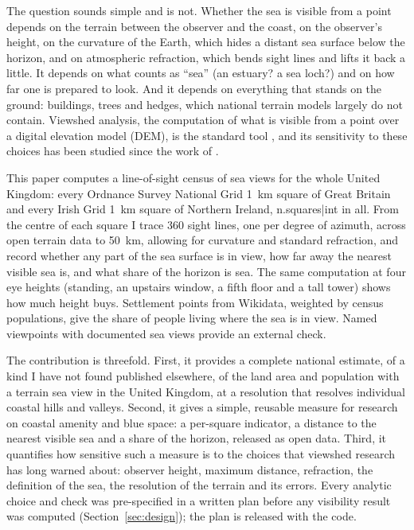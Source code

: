 The question sounds simple and is not. Whether the sea is visible from a point depends on the terrain between the observer and the coast, on the observer's height, on the curvature of the Earth, which hides a distant sea surface below the horizon, and on atmospheric refraction, which bends sight lines and lifts it back a little. It depends on what counts as ``sea'' (an estuary? a sea loch?) and on how far one is prepared to look. And it depends on everything that stands on the ground: buildings, trees and hedges, which national terrain models largely do not contain. Viewshed analysis, the computation of what is visible from a point over a digital elevation model (DEM), is the standard tool \citep{defloriani2003}, and its sensitivity to these choices has been studied since the work of \citet{fisher1991,fisher1992,fisher1993}.

This paper computes a line-of-sight census of sea views for the whole United Kingdom: every Ordnance Survey National Grid 1~km square of Great Britain and every Irish Grid 1~km square of Northern Ireland, {{n.squares|int}} in all. From the centre of each square I trace 360 sight lines, one per degree of azimuth, across open terrain data to 50~km, allowing for curvature and standard refraction, and record whether any part of the sea surface is in view, how far away the nearest visible sea is, and what share of the horizon is sea. The same computation at four eye heights (standing, an upstairs window, a fifth floor and a tall tower) shows how much height buys. Settlement points from Wikidata, weighted by census populations, give the share of people living where the sea is in view. Named viewpoints with documented sea views provide an external check.

The contribution is threefold. First, it provides a complete national estimate, of a kind I have not found published elsewhere, of the land area and population with a terrain sea view in the United Kingdom, at a resolution that resolves individual coastal hills and valleys. Second, it gives a simple, reusable measure for research on coastal amenity and blue space: a per-square indicator, a distance to the nearest visible sea and a share of the horizon, released as open data. Third, it quantifies how sensitive such a measure is to the choices that viewshed research has long warned about: observer height, maximum distance, refraction, the definition of the sea, the resolution of the terrain and its errors. Every analytic choice and check was pre-specified in a written plan before any visibility result was computed (Section~\ref{sec:design}); the plan is released with the code.

